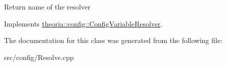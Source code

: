 Return name of the resolver 

Implements \hyperlink{classtheoria_1_1config_1_1ConfigVariableResolver_a026bda729faf988eaef334a45ec92303}{theoria\+::config\+::\+Config\+Variable\+Resolver}.



The documentation for this class was generated from the following file\+:\begin{DoxyCompactItemize}
\item 
src/config/Resolve.\+cpp\end{DoxyCompactItemize}
